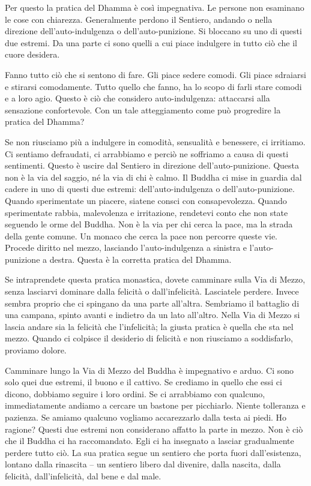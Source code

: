 Per questo la pratica del Dhamma è così impegnativa. Le persone non
esaminano le cose con chiarezza. Generalmente perdono il Sentiero,
andando o nella direzione dell'auto-indulgenza o dell'auto-punizione. Si
bloccano su uno di questi due estremi. Da una parte ci sono quelli a cui
piace indulgere in tutto ciò che il cuore desidera.

Fanno tutto ciò che
si sentono di fare. Gli piace sedere comodi. Gli piace sdraiarsi e
stirarsi comodamente. Tutto quello che fanno, ha lo scopo di farli stare
comodi e a loro agio. Questo è ciò che considero auto-indulgenza:
attaccarsi alla sensazione confortevole. Con un tale atteggiamento come
può progredire la pratica del Dhamma?

Se non riusciamo più a indulgere in comodità, sensualità e benessere, ci
irritiamo. Ci sentiamo defraudati, ci arrabbiamo e perciò ne soffriamo a
causa di questi sentimenti. Questo è uscire dal Sentiero in direzione
dell'auto-punizione. Questa non è la via del saggio, né la via di chi è
calmo. Il Buddha ci mise in guardia dal cadere in uno di questi due
estremi: dell'auto-indulgenza o dell'auto-punizione. Quando sperimentate
un piacere, siatene consci con consapevolezza. Quando sperimentate
rabbia, malevolenza e irritazione, rendetevi conto che non state
seguendo le orme del Buddha. Non è la via per chi cerca la pace, ma la
strada della gente comune. Un monaco che cerca la pace non percorre
queste vie. Procede diritto nel mezzo, lasciando l'auto-indulgenza a
sinistra e l'auto-punizione a destra. Questa è la corretta pratica del
Dhamma.

Se intraprendete questa pratica monastica, dovete camminare sulla Via di
Mezzo, senza lasciarvi dominare dalla felicità o dall'infelicità.
Lasciatele perdere. Invece sembra proprio che ci spingano da una parte
all'altra. Sembriamo il battaglio di una campana, spinto avanti e
indietro da un lato all'altro. Nella Via di Mezzo si lascia andare sia
la felicità che l'infelicità; la giusta pratica è quella che sta nel
mezzo. Quando ci colpisce il desiderio di felicità e non riusciamo a
soddisfarlo, proviamo dolore.

Camminare lungo la Via di Mezzo del Buddha è impegnativo e arduo. Ci
sono solo quei due estremi, il buono e il cattivo. Se crediamo in quello
che essi ci dicono, dobbiamo seguire i loro ordini. Se ci arrabbiamo con
qualcuno, immediatamente andiamo a cercare un bastone per picchiarlo.
Niente tolleranza e pazienza. Se amiamo qualcuno vogliamo accarezzarlo
dalla testa ai piedi. Ho ragione? Questi due estremi non considerano
affatto la parte in mezzo. Non è ciò che il Buddha ci ha raccomandato.
Egli ci ha insegnato a lasciar gradualmente perdere tutto ciò. La sua
pratica segue un sentiero che porta fuori dall'esistenza, lontano dalla
rinascita -- un sentiero libero dal divenire, dalla nascita, dalla
felicità, dall'infelicità, dal bene e dal male.

